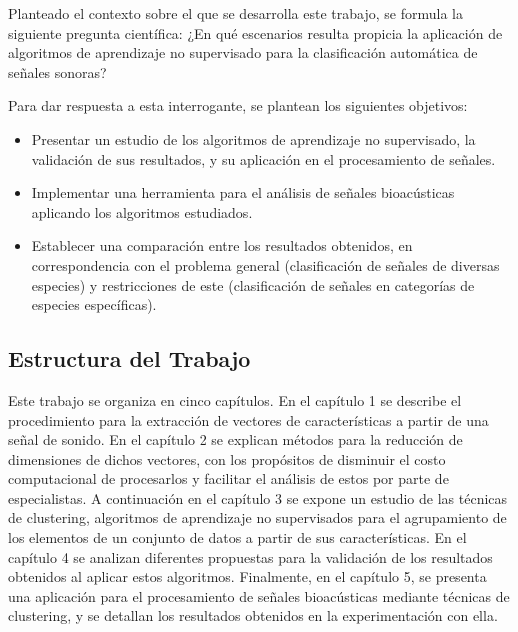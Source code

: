 Planteado el contexto sobre el que se desarrolla este trabajo, se formula la siguiente pregunta científica: ¿En qué escenarios resulta propicia la aplicación de algoritmos de aprendizaje no supervisado para la clasificación automática de señales sonoras?

Para dar respuesta a esta interrogante, se plantean los siguientes objetivos:
\begin{itemize}
    \item Presentar un estudio de los algoritmos de aprendizaje no supervisado, la validación de sus resultados, y su aplicación en el procesamiento de señales.
    \item Implementar una herramienta para el análisis de señales bioacústicas aplicando los algoritmos estudiados.
    \item Establecer una comparación entre los resultados obtenidos, en correspondencia con el problema general (clasificación de señales de diversas especies) y restricciones de este (clasificación de señales en categorías de especies específicas).
\end{itemize}

\subsection*{Estructura del Trabajo}\label{subsec:estructuraDelTrabajo}

Este trabajo se organiza en cinco capítulos.
En el capítulo 1 se describe el procedimiento para la extracción de vectores de características a partir de una señal de sonido.
En el capítulo 2 se explican métodos para la reducción de dimensiones de dichos vectores, con los propósitos de disminuir el costo computacional de procesarlos y facilitar el análisis de estos por parte de especialistas.
A continuación en el capítulo 3 se expone un estudio de las técnicas de clustering, algoritmos de aprendizaje no supervisados para el agrupamiento de los elementos de un conjunto de datos a partir de sus características.
En el capítulo 4 se analizan diferentes propuestas para la validación de los resultados obtenidos al aplicar estos algoritmos.
Finalmente, en el capítulo 5, se presenta una aplicación para el procesamiento de señales bioacústicas mediante técnicas de clustering, y se detallan los resultados obtenidos en la experimentación con ella.
